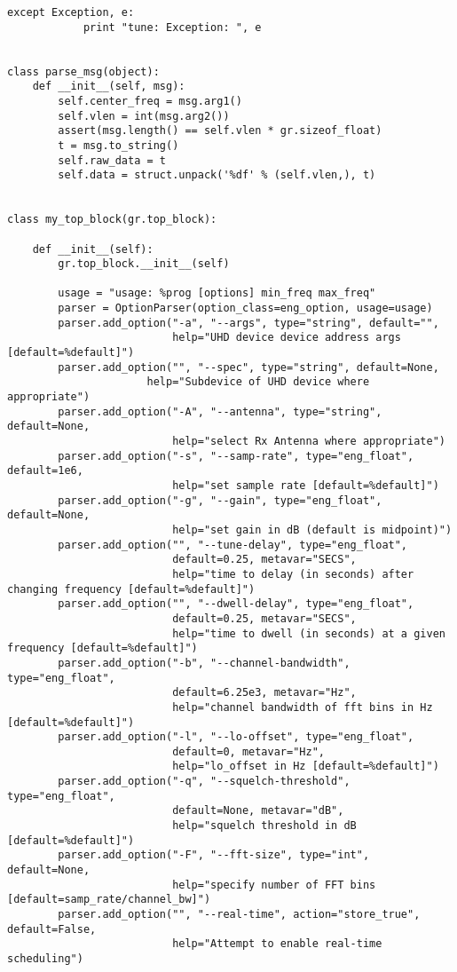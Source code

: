 \begin{lstlisting}[breaklines]
        except Exception, e:
            print "tune: Exception: ", e


class parse_msg(object):
    def __init__(self, msg):
        self.center_freq = msg.arg1()
        self.vlen = int(msg.arg2())
        assert(msg.length() == self.vlen * gr.sizeof_float)
        t = msg.to_string()
        self.raw_data = t
        self.data = struct.unpack('%df' % (self.vlen,), t)


class my_top_block(gr.top_block):

    def __init__(self):
        gr.top_block.__init__(self)

        usage = "usage: %prog [options] min_freq max_freq"
        parser = OptionParser(option_class=eng_option, usage=usage)
        parser.add_option("-a", "--args", type="string", default="",
                          help="UHD device device address args [default=%default]")
        parser.add_option("", "--spec", type="string", default=None,
	                  help="Subdevice of UHD device where appropriate")
        parser.add_option("-A", "--antenna", type="string", default=None,
                          help="select Rx Antenna where appropriate")
        parser.add_option("-s", "--samp-rate", type="eng_float", default=1e6,
                          help="set sample rate [default=%default]")
        parser.add_option("-g", "--gain", type="eng_float", default=None,
                          help="set gain in dB (default is midpoint)")
        parser.add_option("", "--tune-delay", type="eng_float",
                          default=0.25, metavar="SECS",
                          help="time to delay (in seconds) after changing frequency [default=%default]")
        parser.add_option("", "--dwell-delay", type="eng_float",
                          default=0.25, metavar="SECS",
                          help="time to dwell (in seconds) at a given frequency [default=%default]")
        parser.add_option("-b", "--channel-bandwidth", type="eng_float",
                          default=6.25e3, metavar="Hz",
                          help="channel bandwidth of fft bins in Hz [default=%default]")
        parser.add_option("-l", "--lo-offset", type="eng_float",
                          default=0, metavar="Hz",
                          help="lo_offset in Hz [default=%default]")
        parser.add_option("-q", "--squelch-threshold", type="eng_float",
                          default=None, metavar="dB",
                          help="squelch threshold in dB [default=%default]")
        parser.add_option("-F", "--fft-size", type="int", default=None,
                          help="specify number of FFT bins [default=samp_rate/channel_bw]")
        parser.add_option("", "--real-time", action="store_true", default=False,
                          help="Attempt to enable real-time scheduling")


\end{lstlisting}
